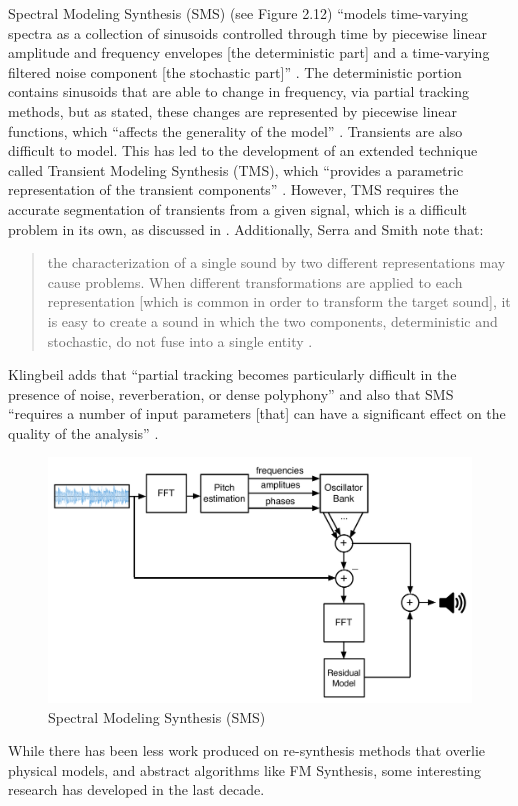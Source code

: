 \documentclass[a4paper,12pt]{report} 	%
\numberwithin{figure}{chapter}
\numberwithin{table}{chapter}
\numberwithin{equation}{chapter}
\begin{document}
\begin{flushleft}
Spectral Modeling Synthesis (SMS) (see Figure 2.12) ``models time-varying spectra as a collection of sinusoids controlled through time by piecewise linear amplitude and frequency envelopes [the deterministic part] and a time-varying filtered noise component [the stochastic part]'' \cite[p. 12]{Serra:1990dk}. The deterministic portion contains sinusoids that are able to change in frequency, via partial tracking methods, but as stated, these changes are represented by piecewise linear functions, which ``affects the generality of the model'' \cite[p. 31]{Tolonen:1998bh}. Transients are also difficult to model. This has led to the development of an extended technique called Transient Modeling Synthesis (TMS), which ``provides a parametric representation of the transient components'' \cite[p. 33]{Tolonen:1998bh}. However, TMS requires the accurate segmentation of transients from a given signal, which is a difficult problem in its own, as discussed in \cite[p. 16]{Ciglar:2009uf}. Additionally, Serra and Smith note that:

\begin{quote}
\selectfont
the characterization of a single sound by two different representations may cause problems. When different transformations are applied to each representation [which is common in order to transform the target sound], it is easy to create a sound in which the two components, deterministic and stochastic, do not fuse into a single entity \cite[p. 23]{Serra:1990dk}.
\end{quote}
\selectfont

Klingbeil adds that ``partial tracking becomes particularly difficult in the presence of noise, reverberation, or dense polyphony'' and also that SMS ``requires a number of input parameters [that] can have a significant effect on the quality of the analysis'' \cite[p. 42]{Klingbeil:2009lo}.
\\
\begin{figure}[h!]
\begin{center}
\includegraphics[scale=0.55]{SMS}
\caption[SMS]{Spectral Modeling Synthesis (SMS)}
\end{center}
\end{figure}
While there has been less work produced on re-synthesis methods that overlie physical models, and abstract algorithms like FM Synthesis, some interesting research has developed in the last decade.


\end{flushleft}
\end{document}
